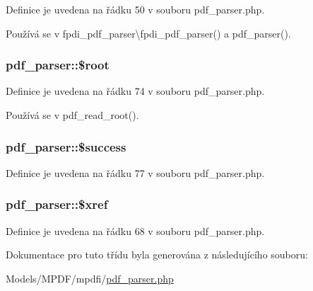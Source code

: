 Definice je uvedena na řádku 50 v souboru pdf\-\_\-parser.\-php.



Používá se v fpdi\-\_\-pdf\-\_\-parser\textbackslash{}fpdi\-\_\-pdf\-\_\-parser() a pdf\-\_\-parser().

\hypertarget{classpdf__parser_a08f56dfcce505a3d13c04144a6490cc7}{
\subsubsection[{\$root}]{\setlength{\rightskip}{0pt plus 5cm}pdf\-\_\-parser\-::\$root}}\label{classpdf__parser_a08f56dfcce505a3d13c04144a6490cc7}


Definice je uvedena na řádku 74 v souboru pdf\-\_\-parser.\-php.



Používá se v pdf\-\_\-read\-\_\-root().

\hypertarget{classpdf__parser_a4bbb3b441beee94e1bc4ca2d628526bd}{
\subsubsection[{\$success}]{\setlength{\rightskip}{0pt plus 5cm}pdf\-\_\-parser\-::\$success}}\label{classpdf__parser_a4bbb3b441beee94e1bc4ca2d628526bd}


Definice je uvedena na řádku 77 v souboru pdf\-\_\-parser.\-php.

\hypertarget{classpdf__parser_a9591e309725fa7b418e25b48b933587b}{
\subsubsection[{\$xref}]{\setlength{\rightskip}{0pt plus 5cm}pdf\-\_\-parser\-::\$xref}}\label{classpdf__parser_a9591e309725fa7b418e25b48b933587b}


Definice je uvedena na řádku 68 v souboru pdf\-\_\-parser.\-php.



Dokumentace pro tuto třídu byla generována z následujícího souboru\-:\begin{DoxyCompactItemize}
\item 
Models/\-M\-P\-D\-F/mpdfi/\hyperlink{pdf__parser_8php}{pdf\-\_\-parser.\-php}\end{DoxyCompactItemize}
